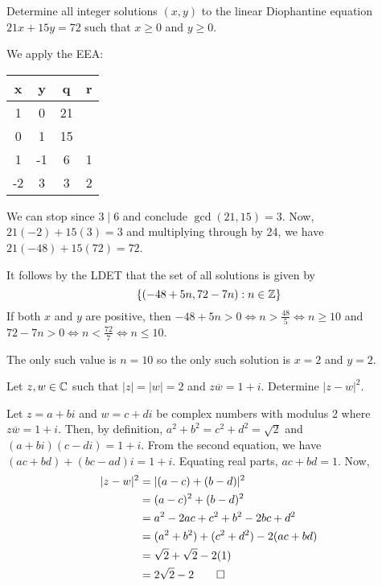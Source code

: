 \begin{prob}
  Determine all integer solutions $(x,y)$ to the linear Diophantine equation $21x+15y=72$
  such that $x \geq 0$ and $y \geq 0$.
\end{prob}
\begin{sol}
  We apply the EEA\@:
  \begin{center}
    \begin{tabular}{C|C|C|C}
      x  & y  & q  & r \\   & 0  & 21     \\
      0  & 1  & 15     \\
      1  & -1 & 6  & 1 \\
      -2 & 3  & 3  & 2
    \end{tabular}
  \end{center}
  We can stop since $3 \mid 6$ and conclude $\gcd(21,15) = 3$.
  Now, $21(-2) + 15(3) = 3$ and multiplying through by 24, we have $21(-48) + 15(72) = 72$.

  It follows by the LDET that the set of all solutions is given by
  \[ \{ (-48 + 5n, 72 - 7n) : n \in \mathbb{Z} \} \]
  If both $x$ and $y$ are positive, then $-48 + 5n > 0 \iff n > \frac{48}{5} \iff n \geq 10$
  and $72 - 7n > 0 \iff n < \frac{72}{7} \iff n \leq 10$.

  The only such value is $n = 10$ so the only such solution is $x = 2$ and $y = 2$.
\end{sol}

\begin{prob}
  Let $z,w\in\mathbb{C}$ such that $|z| = |w| = 2$ and $z\overline{w}=1+i$.
  Determine $|z-w|^2$.
\end{prob}
\begin{sol}
  Let $z = a+bi$ and $w = c+di$ be complex numbers with modulus 2 where $z\overline{w} = 1+i$.
  Then, by definition, $a^2 + b^2 = c^2 + d^2 = \sqrt{2}$ and $(a+bi)(c-di) = 1+i$.
  From the second equation, we have $(ac + bd) + (bc - ad)i = 1+i$.
  Equating real parts, $ac + bd = 1$.
  Now, \begin{align*}
    |z-w|^2 & = |(a-c) + (b-d)|^2                      \\
            & = (a-c)^2 + (b-d)^2                      \\
            & = a^2 - 2ac + c^2 + b^2 - 2bc + d^2      \\
            & = (a^2 + b^2) + (c^2 + d^2) - 2(ac + bd) \\
            & = \sqrt{2} + \sqrt{2} - 2(1)             \\
            & = 2\sqrt{2} - 2 \qedhere
  \end{align*}
\end{sol}


